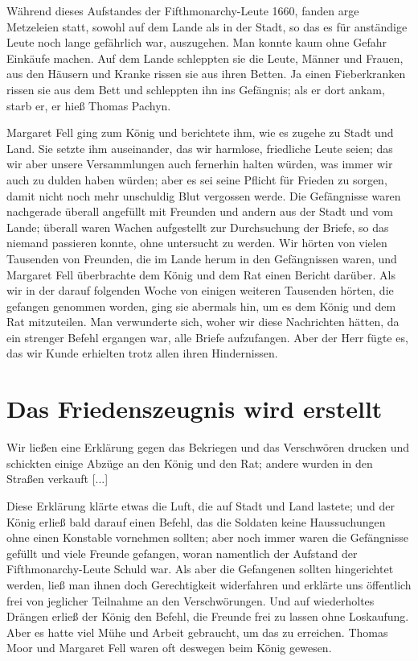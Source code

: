 Während dieses Aufstandes der Fifthmonarchy-Leute 
1660,
fanden arge Metzeleien statt, sowohl auf dem Lande als in der
Stadt, so das es für anständige Leute noch lange gefährlich war,
auszugehen. Man konnte kaum ohne Gefahr Einkäufe machen.
Auf dem Lande schleppten sie die Leute, Männer und Frauen,
aus den Häusern und Kranke rissen sie aus ihren Betten. Ja
einen Fieberkranken rissen sie aus dem Bett und schleppten ihn
ins Gefängnis; als er dort ankam, starb er, er hieß Thomas
Pachyn.

Margaret Fell ging zum König 
und berichtete ihm, wie es
zugehe zu Stadt und Land. Sie setzte ihm auseinander, das wir
harmlose, friedliche Leute seien; das wir aber unsere Versammlungen 
auch fernerhin halten würden, was immer wir auch zu
dulden haben würden; aber es sei seine Pflicht für Frieden zu
sorgen, damit nicht noch mehr unschuldig Blut vergossen werde.
Die Gefängnisse waren nachgerade überall angefüllt mit
Freunden und andern aus der Stadt und vom Lande; überall
waren Wachen aufgestellt zur Durchsuchung der Briefe, so das
niemand passieren konnte, ohne untersucht zu werden. Wir hörten
von vielen Tausenden von Freunden, die im Lande herum in den
Gefängnissen waren, und Margaret Fell überbrachte dem König
und dem Rat einen Bericht darüber. Als wir in der darauf 
folgenden Woche von einigen weiteren Tausenden hörten, die 
gefangen genommen worden, ging sie abermals hin, um es dem König
und dem Rat mitzuteilen. Man verwunderte sich, woher wir
diese Nachrichten hätten, da ein strenger Befehl ergangen war,
alle Briefe aufzufangen. Aber der Herr fügte es, das wir Kunde
erhielten trotz allen ihren Hindernissen.

\section{Das Friedenszeugnis wird erstellt}

Wir ließen eine Erklärung gegen das Bekriegen und das
Verschwören drucken und schickten einige Abzüge an den König
und den Rat; andere wurden in den Straßen verkauft [...]

Diese Erklärung klärte etwas die Luft, die auf Stadt und
Land lastete; und der König erließ bald darauf einen Befehl,
das die Soldaten keine Haussuchungen ohne einen Konstable
vornehmen sollten; aber noch immer waren die Gefängnisse gefüllt
und viele Freunde gefangen, woran namentlich der Aufstand der
Fifthmonarchy-Leute Schuld war. 
Als aber die Gefangenen
sollten hingerichtet werden, ließ man ihnen doch Gerechtigkeit 
widerfahren und erklärte uns öffentlich frei von jeglicher Teilnahme an
den Verschwörungen. Und auf wiederholtes Drängen erließ der
König den Befehl, die Freunde frei zu lassen ohne Loskaufung.
Aber es hatte viel Mühe und Arbeit gebraucht, um das zu
erreichen. Thomas Moor und Margaret Fell waren oft deswegen
beim König gewesen.

